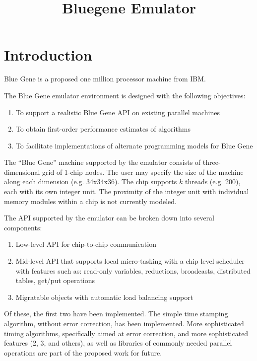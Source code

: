 \documentclass[10pt]{article}
\title{Bluegene Emulator}
\begin{document}
\maketitle

\section{Introduction}

Blue Gene is a proposed one million processor machine from IBM.

The Blue Gene emulator environment is designed with the following
objectives:

\begin{enumerate}
\item To support a realistic Blue Gene API on existing parallel machines

\item To obtain first-order performance estimates of algorithms

\item To facilitate implementations of alternate programming models for
      Blue Gene
\end{enumerate}

The ``Blue Gene'' machine supported by the emulator consists of
three-dimensional grid of 1-chip nodes.  The user may specify the size
of the machine along each dimension (e.g. 34x34x36).  The chip supports
$k$ threads (e.g. 200), each with its own integer unit.  The proximity of
the integer unit with individual memory modules within a chip is not
currently modeled.

The API supported by the emulator can be broken down into several
components:

\begin{enumerate}
\item Low-level API for chip-to-chip communication
\item Mid-level API that supports local micro-tasking with a chip level
scheduler with features such as: read-only variables, reductions, broadcasts,
distributed tables, get/put operations
\item Migratable objects with automatic load balancing support
\end{enumerate}

Of these, the first two have been implemented.  The simple time stamping
algorithm, without error correction, has been implemented.  More
sophisticated timing algorithms, specifically aimed at error correction,
and more sophisticated features (2, 3, and others), as well as libraries
of commonly needed parallel operations are part of the proposed work for
future.
\end{document}
